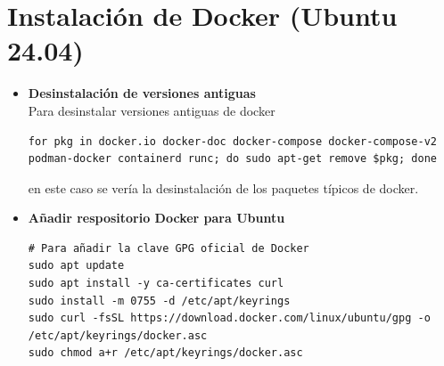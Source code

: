 \section{Instalación de Docker (Ubuntu 24.04)}
\begin{itemize}
    \item[§] \textbf{Desinstalación de versiones antiguas}\\
Para desinstalar versiones antiguas de docker 
\begin{lstlisting}
for pkg in docker.io docker-doc docker-compose docker-compose-v2 podman-docker containerd runc; do sudo apt-get remove $pkg; done
\end{lstlisting}
en este caso se vería la desinstalación de los paquetes típicos de docker.
    \item[§] \textbf{Añadir respositorio Docker para Ubuntu}
\begin{lstlisting}
# Para añadir la clave GPG oficial de Docker
sudo apt update
sudo apt install -y ca-certificates curl
sudo install -m 0755 -d /etc/apt/keyrings
sudo curl -fsSL https://download.docker.com/linux/ubuntu/gpg -o /etc/apt/keyrings/docker.asc
sudo chmod a+r /etc/apt/keyrings/docker.asc


\end{lstlisting}
\end{itemize}
